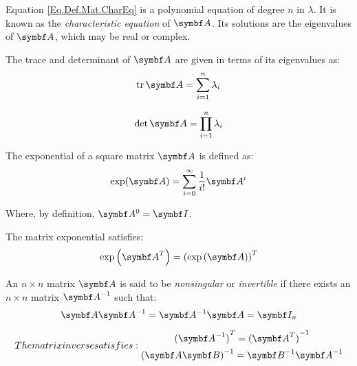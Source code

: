 Equation \eqref{Eq.Def.Mat.CharEq} is a polynomial equation of degree $n$ in $\lambda$. It is known as the \emph{characteristic equation} of $\mat{A}$. Its solutions are the eigenvalues of $\mat{A}$, which may be real or complex.

The trace and determinant of $\mat{A}$ are given in terms of its eigenvalues as:
\begin{equation} \label{Eq.Res.Mat.TrEig}
\trace{\mat{A}} = \sum^{n}_{i=1} \lambda_{i}
\end{equation}

\begin{equation} \label{Eq.Res.Mat.DetEig}
\det \mat{A} = \prod^{n}_{i=1} \lambda_{i}
\end{equation}


The exponential of a square matrix $\mat{A}$ is defined as:
\begin{equation} \label{Eq.Def.MatExp}
\exp(\mat{A}) = \sum^{\infty}_{i=0} \frac{1}{i!} \mat{A}^i
\end{equation}

Where, by definition, $\mat{A}^0=\IdM$.

The matrix exponential satisfies:
\begin{equation} \label{Eq.Res.MatExpTrans}
\exp\rndp{\tr{\mat{A}}} = \trp{\exp\rndp{\mat{A}}}
\end{equation}

An $n \times n$ matrix $\mat{A}$ is said to be \emph{nonsingular} or \emph{invertible} if there exists an $n \times n$ matrix $\inv{\mat{A}}$ such that:
\begin{equation} \label{Eq.Def.MatInv}
\mat{A} \inv{\mat{A}} = \inv{\mat{A}} \mat{A} = \IdM_{n}
\end{equation}

\begin{subequations}
The matrix inverse satisfies:
\begin{gather}
\tr{(\inv{\mat{A}})}=\inv{(\tr{\mat{A}})} \label{Eq.Res.MatInvTrans} \\
\inv{(\mat{A}\mat{B})}=\inv{\mat{B}} \inv{\mat{A}} \label{Eq.Res.MatInvProd}
\end{gather}
\end{subequations}

